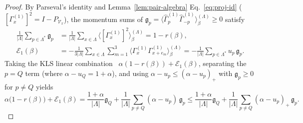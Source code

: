 \documentclass[11pt]{article}
\theoremstyle{definition}
\theoremstyle{remark}
\newcommand{\calV}{\mathcal{V}}
\newcommand{\calE}{\mathcal{E}}
\begin{document}
\begin{proof}
By Parseval's identity and Lemma~\ref{lem:pair-algebra} Eq.~\eqref{eq:proj-id} ($[\Gamma_x^{(1)}]^2 = I - P_{\calV_x}$), the momentum sums of $\mathfrak{g}_p = \langle \hat{\Gamma}_p^{(1)}\hat{\Gamma}_{-p}^{(1)} \rangle_\beta^{(\Lambda)} \ge 0$ satisfy
\begin{equation}\label{eq:parseval-sums}
\begin{aligned}
\frac{1}{|\Lambda|}\sum_{p \in \Lambda^*} \mathfrak{g}_p &= \frac{1}{|\Lambda|}\sum_{x \in \Lambda} \langle [\Gamma_x^{(1)}]^2 \rangle_\beta^{(\Lambda)} = 1 - r(\beta), \\
\calE_1(\beta) &= -\frac{1}{3|\Lambda|} \sum_{x \in \Lambda} \sum_{m=1}^3 \langle \Gamma_x^{(1)}\Gamma_{x+e_m}^{(1)} \rangle_\beta^{(\Lambda)} = -\frac{1}{|\Lambda|} \sum_{p \in \Lambda^*} u_p\,\mathfrak{g}_p.
\end{aligned}
\end{equation}
Taking the KLS linear combination~\cite{kennedy1988} $\alpha(1 - r(\beta)) + \calE_1(\beta)$, separating the $p = Q$ term (where $\alpha - u_Q = 1 + \alpha$), and using $\alpha - u_p \le (\alpha - u_p)_+$ with $\mathfrak{g}_p \ge 0$ for $p \ne Q$ yields
\begin{equation}\label{eq:kls-split}
\alpha\bigl(1 - r(\beta)\bigr) + \calE_1(\beta) = \frac{1 + \alpha}{|\Lambda|}\mathfrak{g}_Q + \frac{1}{|\Lambda|} \sum_{p \ne Q} (\alpha - u_p)\,\mathfrak{g}_p \le \frac{1 + \alpha}{|\Lambda|}\mathfrak{g}_Q + \frac{1}{|\Lambda|} \sum_{p \ne Q} (\alpha - u_p)_+\,\mathfrak{g}_p.
\end{equation}


\end{proof}
\end{document}
